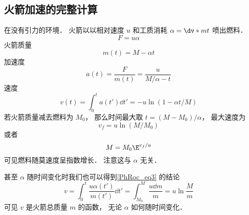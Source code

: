 \subsection{火箭加速的完整计算}
在没有引力的环境． 火箭以以相对速度 $u$ 和工质消耗 $\alpha = \dv*{m}{t}$  喷出燃料．
\begin{equation}
F = u\alpha
\end{equation}
火箭质量
\begin{equation}
m(t) = M - \alpha t
\end{equation}
加速度
\begin{equation}
a(t) = \frac{F}{m(t)} = \frac{u}{M/\alpha - t}
\end{equation}
速度
\begin{equation}
v(t) = \int_0^t a(t') \dd{t'} = -u \ln(1 - \alpha t / M)
\end{equation}
若火箭质量减去燃料为 $M_0$， 那么时间最大取 $t = (M - M_0)/\alpha$， 最大速度为
\begin{equation}
v_f = u \ln(M / M_0)
\end{equation}
或者
\begin{equation}\label{PhRoc_eq3}
M = M_0\E^{v_f/u}
\end{equation}
可见燃料随莫速度呈指数增长． 注意这与 $\alpha$ 无关．

甚至 $\alpha$ 随时间变化时我们也可以得到\autoref{PhRoc_eq3} 的结论
\begin{equation}
v = \int_0^t \frac{u\alpha(t')}{m(t')}\dd{t'} = \int_{M_0}^M \frac{u\dd{m}}{m} = u\ln{\frac{M}{m}}
\end{equation}
可见 $v$ 是火箭总质量 $m$ 的函数， 无论 $\alpha$ 如何随时间变化．
